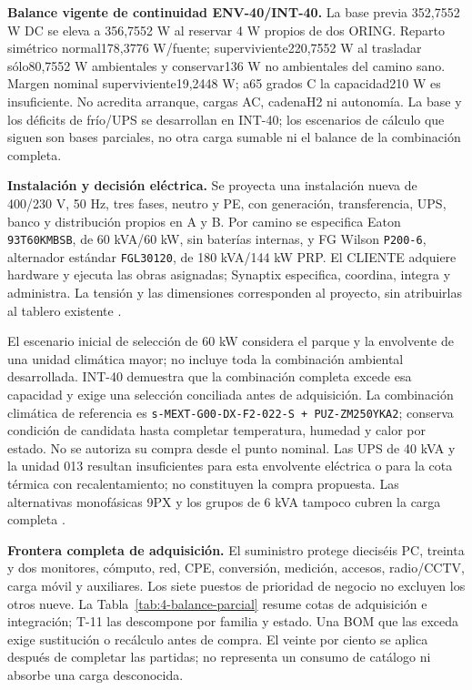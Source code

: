\textbf{Balance vigente de continuidad ENV-40/INT-40.} La base previa 352,7552 W DC se eleva a 356,7552 W al reservar 4 W propios de dos ORING. Reparto simétrico normal178,3776 W/fuente; superviviente220,7552 W al trasladar sólo80,7552 W ambientales y conservar136 W no ambientales del camino sano. Margen nominal superviviente19,2448 W; a65 grados C la capacidad210 W es insuficiente. No acredita arranque, cargas AC, cadenaH2 ni autonomía. La base y los déficits de frío/UPS se desarrollan en INT-40; los escenarios de cálculo que siguen son bases parciales, no otra carga sumable ni el balance de la combinación completa.

\textbf{Instalación y decisión eléctrica.} Se proyecta una instalación nueva de 400/230 V, 50 Hz, tres fases, neutro y PE, con generación, transferencia, UPS, banco y distribución propios en A y B. Por camino se especifica Eaton \texttt{93T60KMBSB}, de 60 kVA/60 kW, sin baterías internas, y FG Wilson \texttt{P200-6}, alternador estándar \texttt{FGL30120}, de 180 kVA/144 kW PRP. El CLIENTE adquiere hardware y ejecuta las obras asignadas; Synaptix especifica, coordina, integra y administra. La tensión y las dimensiones corresponden al proyecto, sin atribuirlas al tablero existente \parencites[RT-06.06--13, p.~15]{pucv-transversal}{p7-eaton-93t60}{p7-fg-p200-ficha}.

El escenario inicial de selección de 60 kW considera el parque y la envolvente de una unidad climática mayor; no incluye toda la combinación ambiental desarrollada. INT-40 demuestra que la combinación completa excede esa capacidad y exige una selección conciliada antes de adquisición. La combinación climática de referencia es \texttt{s-MEXT-G00-DX-F2-022-S + PUZ-ZM250YKA2}; conserva condición de candidata hasta completar temperatura, humedad y calor por estado. No se autoriza su compra desde el punto nominal. Las UPS de 40 kVA y la unidad 013 resultan insuficientes para esta envolvente eléctrica o para la cota térmica con recalentamiento; no constituyen la compra propuesta. Las alternativas monofásicas 9PX y los grupos de 6 kVA tampoco cubren la carga completa \parencites{p6-eaton-tecnica40}{p6-mext-pi-2025}{p7-eaton-93t-tecnica}.

\textbf{Frontera completa de adquisición.} El suministro protege dieciséis PC, treinta y dos monitores, cómputo, red, CPE, conversión, medición, accesos, radio/CCTV, carga móvil y auxiliares. Los siete puestos de prioridad de negocio no excluyen los otros nueve. La Tabla~\ref{tab:4-balance-parcial} resume cotas de adquisición e integración; T-11 las descompone por familia y estado. Una BOM que las exceda exige sustitución o recálculo antes de compra. El veinte por ciento se aplica después de completar las partidas; no representa un consumo de catálogo ni absorbe una carga desconocida.

